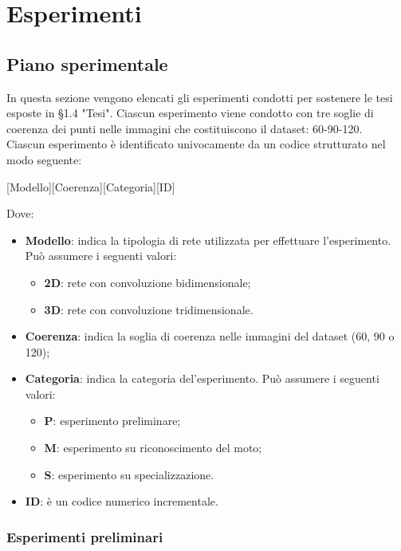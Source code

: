 
\chapter{Esperimenti}

\section{Piano sperimentale}

In questa sezione vengono elencati gli esperimenti condotti per sostenere le tesi esposte in §1.4 "Tesi". Ciascun esperimento viene condotto con tre soglie di coerenza dei punti nelle immagini che costituiscono il dataset: 60-90-120. \\

Ciascun esperimento è identificato univocamente da un codice strutturato nel modo seguente:

\begin{center}
	[Modello][Coerenza][Categoria][ID]
\end{center}

Dove:
\begin{itemize}
	\item \textbf{Modello}: indica la tipologia di rete utilizzata per effettuare l'esperimento. Può assumere i seguenti valori:
	\begin{itemize}
		\item \textbf{2D}: rete con convoluzione bidimensionale;
		\item \textbf{3D}: rete con convoluzione tridimensionale.
	\end{itemize}
	\item \textbf{Coerenza}: indica la soglia di coerenza nelle immagini del dataset (60, 90 o 120);
	\item \textbf{Categoria}: indica la categoria del'esperimento. Può assumere i seguenti valori:
	\begin{itemize}
	\item \textbf{P}: esperimento preliminare;
	\item \textbf{M}: esperimento su riconoscimento del moto;
	\item \textbf{S}: esperimento su specializzazione.
	\end{itemize}
	\item \textbf{ID}: è un codice numerico incrementale.
\end{itemize}

\subsection{Esperimenti preliminari}

